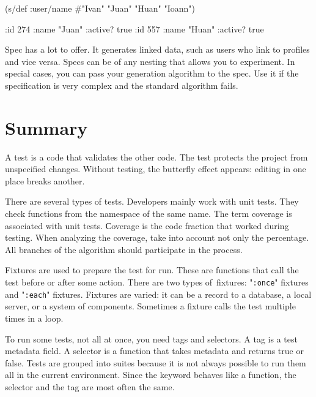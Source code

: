 \else

\begin{english}
  \begin{clojure}
(s/def :user/name #{"Ivan" "Juan" "Huan" "Ioann"})

{:id 274 :name "Juan" :active? true}
{:id 557 :name "Huan" :active? true}
  \end{clojure}
\end{english}

\fi

Spec has a lot to offer. It generates linked data, such as users who link to profiles and vice versa. Specs can be of any nesting that allows you to experiment. In special cases, you can pass your generation algorithm to the spec. Use it if the specification is very complex and the standard algorithm fails.

\section{ Summary }

A test is a code that validates the other code. The test protects the project from unspecified changes. Without testing, the butterfly effect appears: editing in one place breaks another.


There are several types of tests. Developers mainly work with unit tests. They check functions from the namespace of the same name. The term coverage is associated with unit tests. Сoverage is the code fraction that worked during testing. When analyzing the coverage, take into account not only the percentage. All branches of the algorithm should participate in the process.

Fixtures are used to prepare the test for run. These are functions that call the test before or after some action. There are two types of fixtures: "\verb|:once|" fixtures and "\verb|:each|" fixtures. Fixtures are varied: it can be a record to a database, a local server, or a system of components. Sometimes a fixture calls the test multiple times in a loop.

To run some tests, not all at once, you need tags and selectors. A tag is a test metadata field. A selector is a function that takes metadata and returns true or false. Tests are grouped into suites because it is not always possible to run them all in the current environment. Since the keyword behaves like a function, the selector and the tag are most often the same.

